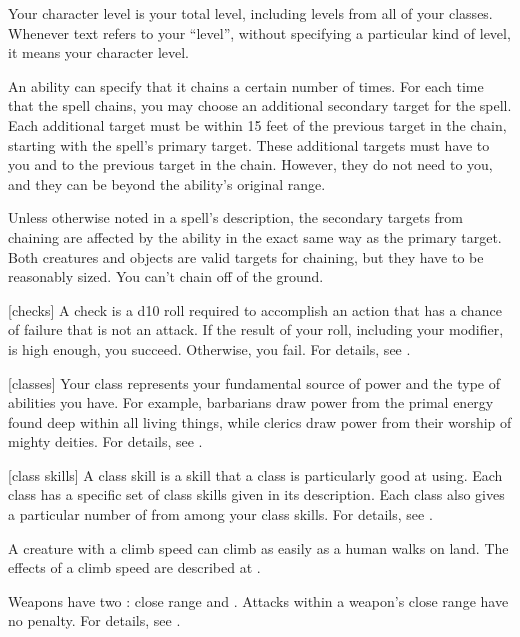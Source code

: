  Your character level is your total level, including levels from all of your classes.
Whenever text refers to your ``level'', without specifying a particular kind of level, it means your character level.

 An ability can specify that it chains a certain number of times.
For each time that the spell chains, you may choose an additional secondary target for the spell.
Each additional target must be within 15 feet of the previous target in the chain, starting with the spell's primary target.
These additional targets must have  to you and  to the previous target in the chain.
However, they do not need  to you, and they can be beyond the ability's original range.

Unless otherwise noted in a spell's description, the secondary targets from chaining are affected by the ability in the exact same way as the primary target.
Both creatures and objects are valid targets for chaining, but they have to be reasonably sized.
You can't chain off of the ground.

[checks] A check is a d10 roll required to accomplish an action that has a chance of failure that is not an attack.
If the result of your roll, including your modifier, is high enough, you succeed.
Otherwise, you fail.
For details, see .

[classes] Your class represents your fundamental source of power and the type of abilities you have.
For example, barbarians draw power from the primal energy found deep within all living things, while clerics draw power from their worship of mighty deities.
For details, see .

[class skills] A class skill is a skill that a class is particularly good at using.
Each class has a specific set of class skills given in its description.
Each class also gives a particular number of  from among your class skills.
For details, see .

 A creature with a climb speed can climb as easily as a human walks on land.
The effects of a climb speed are described at .

 Weapons have two : close range and .
Attacks within a weapon's close range have no penalty.
For details, see .

